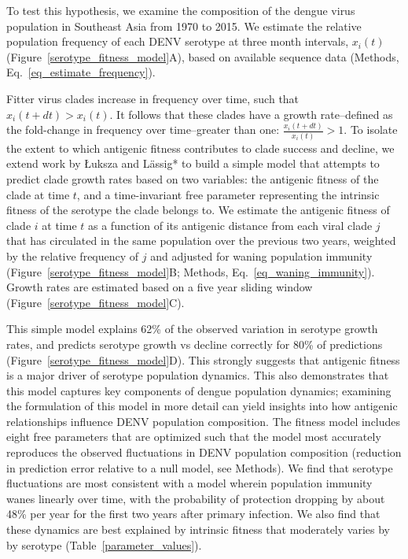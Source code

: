 To test this hypothesis, we examine the composition of the dengue virus population in Southeast Asia from 1970 to 2015.
We estimate the relative population frequency of each DENV serotype at three month intervals, $x_i(t)$ (Figure~\ref{serotype_fitness_model}A), based on available sequence data (Methods, Eq.~\ref{eq_estimate_frequency}).

Fitter virus clades increase in frequency over time, such that $x_i(t+dt) > x_i(t)$.
It follows that these clades have a growth rate--defined as the fold-change in frequency over time--greater than one: $\frac{x_i(t+dt)}{x_i(t)} > 1$.
To isolate the extent to which antigenic fitness contributes to clade success and decline, we extend work by {\L}uksza and L\"assig* \citep{luksza2014predictive} to build a simple model that attempts to predict clade growth rates based on two variables: the antigenic fitness of the clade at time $t$, and a time-invariant free parameter representing the intrinsic fitness of the serotype the clade belongs to.
We estimate the antigenic fitness of clade $i$ at time $t$ as a function of its antigenic distance from each viral clade $j$ that has circulated in the same population over the previous two years, weighted by the relative frequency of $j$ and adjusted for waning population immunity (Figure~\ref{serotype_fitness_model}B; Methods, Eq.~\ref{eq_waning_immunity}).
Growth rates are estimated based on a five year sliding window (Figure~\ref{serotype_fitness_model}C).

This simple model explains 62\% of the observed variation in serotype growth rates, and predicts serotype growth vs decline correctly for 80\% of predictions (Figure~\ref{serotype_fitness_model}D).
This strongly suggests that antigenic fitness is a major driver of serotype population dynamics.
This also demonstrates that this model captures key components of dengue population dynamics; examining the formulation of this model in more detail can yield insights into how antigenic relationships influence DENV population composition.
The fitness model includes eight free parameters that are optimized such that the model most accurately reproduces the observed fluctuations in DENV population composition (reduction in prediction error relative to a null model, see Methods).
We find that serotype fluctuations are most consistent with a model wherein population immunity wanes linearly over time, with the probability of protection dropping by about 48\% per year for the first two years after primary infection.
We also find that these dynamics are best explained by intrinsic fitness that moderately varies by by serotype (Table~\ref{parameter_values}).

